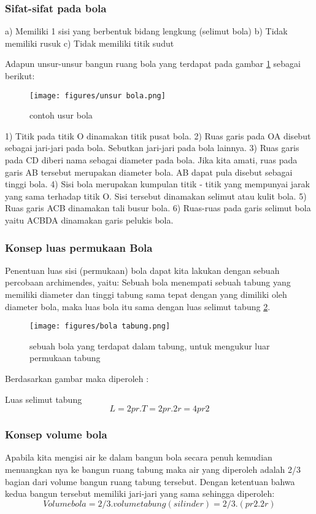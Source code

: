 \subsubsection{Sifat-sifat pada bola} 
a) Memiliki 1 sisi yang berbentuk bidang lengkung (selimut bola) 
b) Tidak memiliki rusuk 
c) Tidak memiliki titik sudut
 
Adapun unsur-unsur bangun ruang bola yang terdapat pada gambar \ref{unsur bola} sebagai berikut:
\begin{figure}[ht]
    \centerline{\texttt{[image: figures/unsur bola.png]}}
    \caption{contoh usur bola}
    \label{unsur bola}
    \end{figure}
1) Titik pada titik O dinamakan titik pusat bola.
2) Ruas garis pada OA disebut sebagai jari-jari pada bola. Sebutkan jari-jari pada bola lainnya.
3) Ruas garis pada CD diberi nama sebagai diameter pada bola. Jika kita amati, ruas pada garis AB tersebut merupakan diameter bola. AB dapat pula disebut sebagai tinggi bola.
4) Sisi bola merupakan kumpulan titik - titik yang mempunyai jarak yang sama terhadap titik O. Sisi tersebut dinamakan selimut atau kulit bola.
5) Ruas garis ACB dinamakan tali busur bola.
6) Ruas-ruas pada garis selimut bola yaitu ACBDA dinamakan garis pelukis bola.

\subsubsection{Konsep luas permukaan Bola}
Penentuan luas sisi (permukaan) bola dapat kita lakukan dengan sebuah percobaan archimendes, yaitu:
Sebuah bola menempati sebuah tabung yang memiliki diameter dan tinggi tabung sama tepat dengan 
yang dimiliki oleh diameter bola, maka luas bola itu sama dengan luas selimut tabung \ref{bola tabung}.
\begin{figure}[ht]
    \centerline{\texttt{[image: figures/bola tabung.png]}}
    \caption{sebuah bola yang terdapat dalam tabung, untuk mengukur luar permukaan tabung}
    \label{bola tabung}
    \end{figure} 
Berdasarkan gambar maka diperoleh :

Luas selimut tabung 
\begin{equation}
					L= 2 pr. T
                    = 2pr. 2r
                    = 4pr2
\end{equation}
            
\subsubsection{Konsep volume bola}
Apabila kita mengisi air ke dalam bangun bola secara penuh 
kemudian menuangkan nya ke bangun ruang tabung maka air yang diperoleh adalah 2/3 bagian dari volume bangun ruang tabung tersebut. 
Dengan ketentuan bahwa kedua bangun tersebut memiliki jari-jari yang sama sehingga diperoleh:
\begin{equation}
Volume bola = 2/3 . volume tabung(silinder)
            = 2/3 . (pr2 . 2r)
\end{equation}

